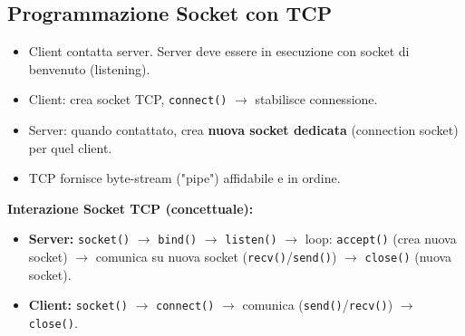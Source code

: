\documentclass{article}
\begin{document}
\subsection{Programmazione Socket con TCP}
\begin{itemize}
    \item Client contatta server. Server deve essere in esecuzione con socket di benvenuto (listening).
    \item Client: crea socket TCP, \texttt{connect()} $\rightarrow$ stabilisce connessione.
    \item Server: quando contattato, crea \textbf{nuova socket dedicata} (connection socket) per quel client.
    \item TCP fornisce byte-stream ("pipe") affidabile e in ordine.
\end{itemize}
\textbf{Interazione Socket TCP (concettuale):}
\begin{itemize}
    \item \textbf{Server:} \texttt{socket()} $\rightarrow$ \texttt{bind()} $\rightarrow$ \texttt{listen()} $\rightarrow$ loop: \texttt{accept()} (crea nuova socket) $\rightarrow$ comunica su nuova socket (\texttt{recv()}/\texttt{send()}) $\rightarrow$ \texttt{close()} (nuova socket).
    \item \textbf{Client:} \texttt{socket()} $\rightarrow$ \texttt{connect()} $\rightarrow$ comunica (\texttt{send()}/\texttt{recv()}) $\rightarrow$ \texttt{close()}.
\end{itemize}
\end{document}
